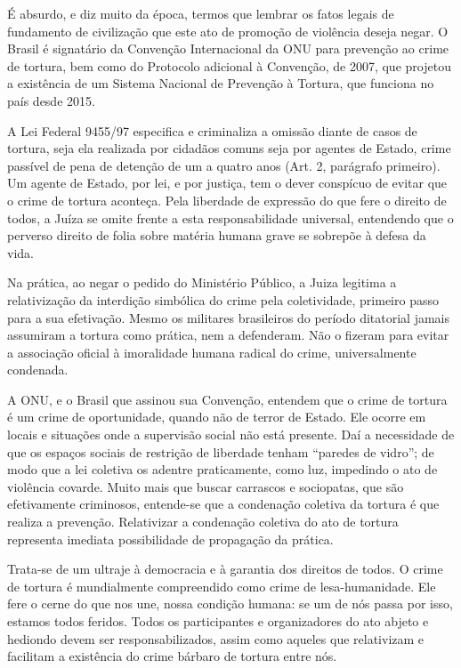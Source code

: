 É absurdo, e diz muito da época, termos que lembrar os fatos legais de
fundamento de civilização que este ato de promoção de violência deseja
negar. O Brasil é signatário da Convenção Internacional da ONU para
prevenção ao crime de tortura, bem como do Protocolo adicional à
Convenção, de 2007, que projetou a existência de um Sistema Nacional de
Prevenção à Tortura, que funciona no país desde 2015.

A Lei Federal 9455/97 especifica e criminaliza a omissão diante de casos
de tortura, seja ela realizada por cidadãos comuns seja por agentes de
Estado, crime passível de pena de detenção de um a quatro anos (Art. 2,
parágrafo primeiro). Um agente de Estado, por lei, e por justiça, tem o
dever conspícuo de evitar que o crime de tortura aconteça. Pela
liberdade de expressão do que fere o direito de todos, a Juíza se omite
frente a esta responsabilidade universal, entendendo que o perverso
direito de folia sobre matéria humana grave se sobrepõe à defesa da
vida.

Na prática, ao negar o pedido do Ministério Público, a Juiza legitima a
relativização da interdição simbólica do crime pela coletividade,
primeiro passo para a sua efetivação. Mesmo os militares brasileiros do
período ditatorial jamais assumiram a tortura como prática, nem a
defenderam. Não o fizeram para evitar a associação oficial à imoralidade
humana radical do crime, universalmente condenada.

A ONU, e o Brasil que assinou sua Convenção, entendem que o crime de
tortura é um crime de oportunidade, quando não de terror de Estado. Ele
ocorre em locais e situações onde a supervisão social não está presente.
Daí a necessidade de que os espaços sociais de restrição de liberdade
tenham ``paredes de vidro''; de modo que a lei coletiva os adentre
praticamente, como luz, impedindo o ato de violência covarde. Muito mais
que buscar carrascos e sociopatas, que são efetivamente criminosos,
entende-se que a condenação coletiva da tortura é que realiza a
prevenção. Relativizar a condenação coletiva do ato de tortura
representa imediata possibilidade de propagação da prática.

Trata-se de um ultraje à democracia e à garantia dos direitos de todos.
O crime de tortura é mundialmente compreendido como crime de
lesa-humanidade. Ele fere o cerne do que nos une, nossa condição humana:
se um de nós passa por isso, estamos todos feridos. Todos os
participantes e organizadores do ato abjeto e hediondo devem ser
responsabilizados, assim como aqueles que relativizam e facilitam a
existência do crime bárbaro de tortura entre nós.

